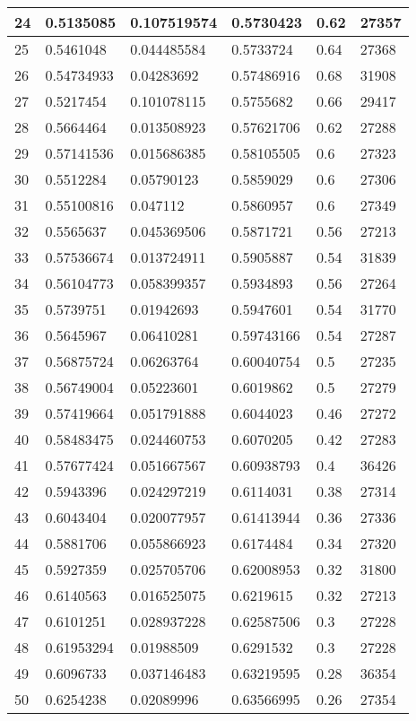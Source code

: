 \begin{longtable}{|l|l|l|l|l|l|}
24 & 0.5135085 & 0.107519574 & 0.5730423 & 0.62 & 27357 \\ \hline 
25 & 0.5461048 & 0.044485584 & 0.5733724 & 0.64 & 27368 \\ \hline 
26 & 0.54734933 & 0.04283692 & 0.57486916 & 0.68 & 31908 \\ \hline 
27 & 0.5217454 & 0.101078115 & 0.5755682 & 0.66 & 29417 \\ \hline 
28 & 0.5664464 & 0.013508923 & 0.57621706 & 0.62 & 27288 \\ \hline 
29 & 0.57141536 & 0.015686385 & 0.58105505 & 0.6 & 27323 \\ \hline 
30 & 0.5512284 & 0.05790123 & 0.5859029 & 0.6 & 27306 \\ \hline 
31 & 0.55100816 & 0.047112 & 0.5860957 & 0.6 & 27349 \\ \hline 
32 & 0.5565637 & 0.045369506 & 0.5871721 & 0.56 & 27213 \\ \hline 
33 & 0.57536674 & 0.013724911 & 0.5905887 & 0.54 & 31839 \\ \hline 
34 & 0.56104773 & 0.058399357 & 0.5934893 & 0.56 & 27264 \\ \hline 
35 & 0.5739751 & 0.01942693 & 0.5947601 & 0.54 & 31770 \\ \hline 
36 & 0.5645967 & 0.06410281 & 0.59743166 & 0.54 & 27287 \\ \hline 
37 & 0.56875724 & 0.06263764 & 0.60040754 & 0.5 & 27235 \\ \hline 
38 & 0.56749004 & 0.05223601 & 0.6019862 & 0.5 & 27279 \\ \hline 
39 & 0.57419664 & 0.051791888 & 0.6044023 & 0.46 & 27272 \\ \hline 
40 & 0.58483475 & 0.024460753 & 0.6070205 & 0.42 & 27283 \\ \hline 
41 & 0.57677424 & 0.051667567 & 0.60938793 & 0.4 & 36426 \\ \hline 
42 & 0.5943396 & 0.024297219 & 0.6114031 & 0.38 & 27314 \\ \hline 
43 & 0.6043404 & 0.020077957 & 0.61413944 & 0.36 & 27336 \\ \hline 
44 & 0.5881706 & 0.055866923 & 0.6174484 & 0.34 & 27320 \\ \hline 
45 & 0.5927359 & 0.025705706 & 0.62008953 & 0.32 & 31800 \\ \hline 
46 & 0.6140563 & 0.016525075 & 0.6219615 & 0.32 & 27213 \\ \hline 
47 & 0.6101251 & 0.028937228 & 0.62587506 & 0.3 & 27228 \\ \hline 
48 & 0.61953294 & 0.01988509 & 0.6291532 & 0.3 & 27228 \\ \hline 
49 & 0.6096733 & 0.037146483 & 0.63219595 & 0.28 & 36354 \\ \hline 
50 & 0.6254238 & 0.02089996 & 0.63566995 & 0.26 & 27354 \\ \hline 
\end{longtable}